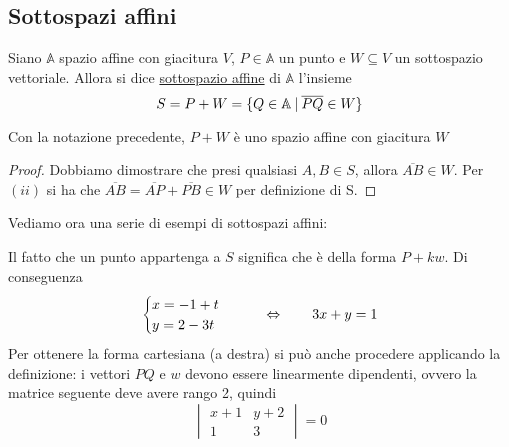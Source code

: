 \documentclass{article}     %
\let\undl\underline
\begin{document}
\subsection{Sottospazi affini}
\begin{boxdef}
    Siano $\mathbb{A}$ spazio affine con giacitura $V$, $P\in \mathbb{A}$ un punto e $W\subseteq V$ un sottospazio vettoriale. Allora si dice \undl{sottospazio affine} di $\mathbb{A}$ l’insieme
    $$
    S=P+W=\{Q\in \mathbb{A}\:|\: \overline{PQ}\in W\}
    $$
\end{boxdef}
\begin{lemma}
    Con la notazione precedente, $P+W$ è uno spazio affine con giacitura $W$
\end{lemma}
\begin{proof}
    Dobbiamo dimostrare che presi qualsiasi $A, B\in S$, allora $\overline{AB}\in W$. Per $(ii)$ si ha che $\overline{AB}= \overline{AP}+\overline{PB}\in W$ per definizione di S.  
\end{proof}
Vediamo ora una serie di esempi di sottospazi affini:
\begin{ex}
    [Sia $\A^2=\R^2$ con il sistema di riferimento canonico. Trovare la equazioni parametriche e cartesiane della retta $S$ passante per $P=(-1,2)$ con direzione (giacitura) $w=(1,3)$.] 

    Il fatto che un punto appartenga a $S$ significa che è della forma $P+kw$. Di conseguenza
    \[\begin{cases}
        x=-1+t\\
        y=2-3t
    \end{cases}\qquad \Leftrightarrow\qquad 3x+y=1\]
    Per ottenere la forma cartesiana (a destra) si può anche procedere applicando la definizione: i vettori $PQ$ e $w$ devono essere linearmente dipendenti, ovvero la matrice seguente deve avere rango 2, quindi 
    \[\begin{vmatrix}
        x+1&y+2\\
        1&3
    \end{vmatrix}=0\]
\end{ex}
\end{document}
